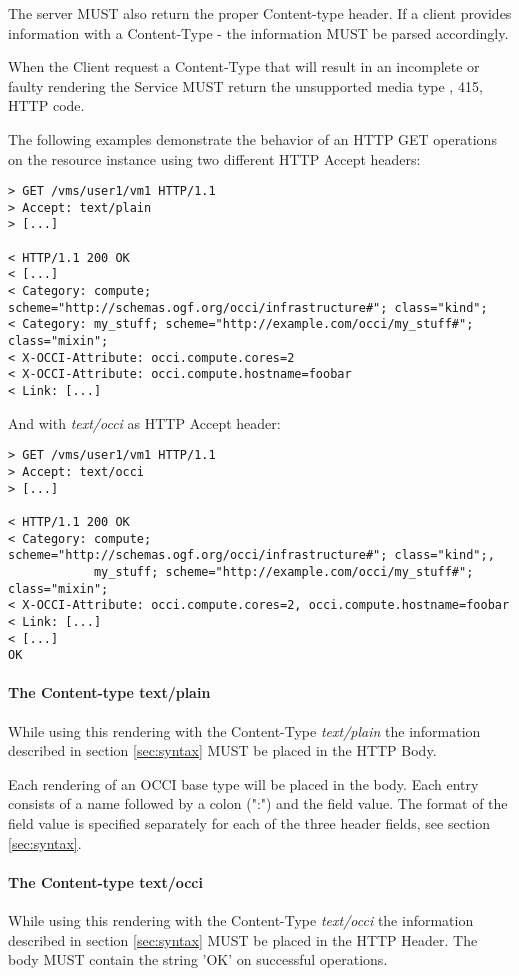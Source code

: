 \documentclass[10pt,a4paper]{article}
\begin{document}
The server MUST also return the proper Content-type header. If a
client provides information with a Content-Type - the information MUST
be parsed accordingly.

When the Client request a Content-Type that will result in an
incomplete or faulty rendering the Service MUST return the unsupported
media type , 415, HTTP code.

The following examples demonstrate the behavior of an HTTP GET
operations on the resource instance \emph{} using two different HTTP
Accept headers:

\begin{verbatim}
> GET /vms/user1/vm1 HTTP/1.1
> Accept: text/plain
> [...]
 
< HTTP/1.1 200 OK
< [...]
< Category: compute; scheme="http://schemas.ogf.org/occi/infrastructure#"; class="kind";
< Category: my_stuff; scheme="http://example.com/occi/my_stuff#"; class="mixin"; 
< X-OCCI-Attribute: occi.compute.cores=2
< X-OCCI-Attribute: occi.compute.hostname=foobar
< Link: [...]
\end{verbatim}

And with \emph{text/occi} as HTTP Accept header:

\begin{verbatim}
> GET /vms/user1/vm1 HTTP/1.1
> Accept: text/occi
> [...]
 
< HTTP/1.1 200 OK
< Category: compute; scheme="http://schemas.ogf.org/occi/infrastructure#"; class="kind";,
            my_stuff; scheme="http://example.com/occi/my_stuff#"; class="mixin";
< X-OCCI-Attribute: occi.compute.cores=2, occi.compute.hostname=foobar
< Link: [...]
< [...]
OK
\end{verbatim}

\paragraph{The Content-type text/plain}
While using this rendering with the Content-Type \textit{text/plain}
the information described in section \ref{sec:syntax} MUST be placed
in the HTTP Body.

Each rendering of an OCCI base type will be placed in the body. Each
entry consists of a name followed by a colon (":") and the field
value. The format of the field value is specified separately for each
of the three header fields, see section \ref{sec:syntax}.

\paragraph{The Content-type text/occi}
While using this rendering with the Content-Type \textit{text/occi}
the information described in section \ref{sec:syntax} MUST be placed
in the HTTP Header. The body MUST contain the string 'OK' on
successful operations.
\end{document}
